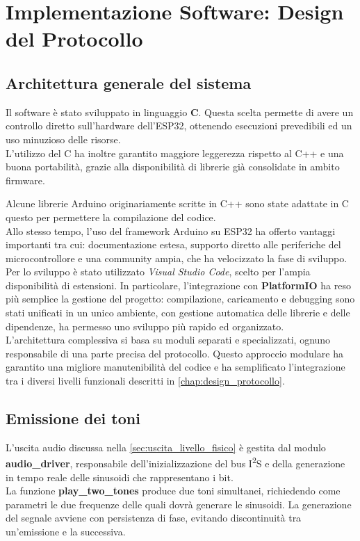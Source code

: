 \chapter{Implementazione Software: Design del Protocollo}
\label{chap:implementazione_software}

\section{Architettura generale del sistema}

Il software è stato sviluppato in linguaggio \textbf{C}. 
Questa scelta permette di avere un controllo diretto sull’hardware dell’ESP32,
 ottenendo esecuzioni prevedibili ed un uso minuzioso delle risorse. \\
 L’utilizzo del C ha inoltre garantito maggiore leggerezza rispetto al C++ e una buona portabilità, grazie alla disponibilità di librerie 
 già consolidate in ambito firmware.  

Alcune librerie Arduino originariamente scritte in C++ sono state adattate in C questo per permettere la compilazione del codice.\\
 Allo stesso tempo, l’uso del framework Arduino su 
  ESP32 ha offerto vantaggi importanti tra cui: documentazione estesa, supporto diretto alle periferiche del microcontrollore e una 
  community ampia, che ha velocizzato la fase di sviluppo. \\

Per lo sviluppo è stato utilizzato \textit{Visual Studio Code}, scelto per l’ampia disponibilità di estensioni.
 In particolare, l’integrazione con \textbf{PlatformIO} ha reso più semplice la gestione del progetto: compilazione, caricamento e debugging sono stati 
 unificati in un unico ambiente, con gestione automatica delle librerie e delle dipendenze, ha permesso uno sviluppo più rapido ed organizzato.\\ 

L’architettura complessiva si basa su moduli separati e specializzati, ognuno responsabile di una parte precisa del protocollo. 
Questo approccio modulare ha garantito una migliore manutenibilità del codice e ha semplificato l’integrazione tra i diversi livelli funzionali 
descritti in \autoref{chap:design_protocollo}.

\section{Emissione dei toni}

L’uscita audio discussa nella \autoref{sec:uscita_livello_fisico} è gestita dal modulo \textbf{audio\_driver}, 
responsabile dell’inizializzazione del bus I\textsuperscript{2}S e della generazione in tempo reale delle sinusoidi che rappresentano i bit. \\
La funzione \textbf{play\_two\_tones} produce due toni simultanei, richiedendo come parametri le due frequenze delle quali dovrà generare le sinusoidi.
La generazione del segnale avviene con persistenza di fase, evitando discontinuità tra un’emissione e la successiva. 


